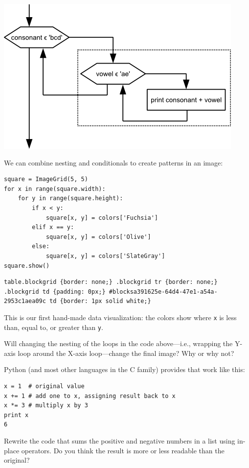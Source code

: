 \documentclass{book}
\begin{document}
\includegraphics{novice/python/img/python-flowchart-nested-loops.png}

We can combine nesting and conditionals to create patterns in an image:

\begin{verbatim}
square = ImageGrid(5, 5)
for x in range(square.width):
    for y in range(square.height):
        if x < y:
            square[x, y] = colors['Fuchsia']
        elif x == y:
            square[x, y] = colors['Olive']
        else:
            square[x, y] = colors['SlateGray']
square.show()
\end{verbatim}

\begin{verbatim}
table.blockgrid {border: none;} .blockgrid tr {border: none;} .blockgrid td {padding: 0px;} #blocksa391625e-64d4-47e1-a54a-2953c1aea09c td {border: 1px solid white;}
\end{verbatim}

This is our first hand-made data visualization: the colors show where
\texttt{x} is less than, equal to, or greater than \texttt{y}.

\begin{challenge}
  Will changing the nesting of the loops in the code above---i.e.,
  wrapping the Y-axis loop around the X-axis loop---change the final
  image? Why or why not?
\end{challenge}

\begin{challenge}
  Python (and most other languages in the C family) provides
   that work like
  this:

\begin{verbatim}
x = 1  # original value
x += 1 # add one to x, assigning result back to x
x *= 3 # multiply x by 3
print x
6
\end{verbatim}

  Rewrite the code that sums the positive and negative numbers in a list
  using in-place operators. Do you think the result is more or less
  readable than the original?
\end{challenge}
\end{document}
